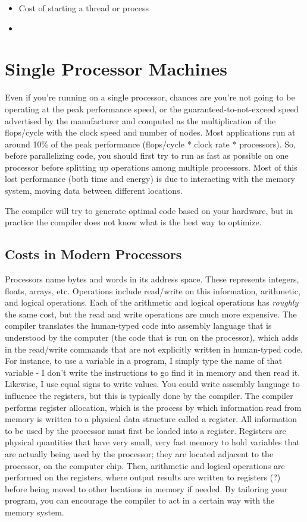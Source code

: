 \documentclass[10pt]{article}
\begin{document}
\begin{flushleft}
\begin{itemize}
\item Cost of starting a thread or process
\item 
\end{itemize}

\section{Single Processor Machines}
 
Even if you're running on a single processor, chances are you're not going to be operating at the peak performance speed, or the guaranteed-to-not-exceed speed advertised by the manufacturer and computed as the multiplication of the flops/cycle with the clock speed and number of nodes. Most applications run at around 10\% of the peak performance (flops/cycle * clock rate * processors). So, before parallelizing code, you should first try to run as fast as possible on one processor before splitting up operations among multiple processors. Most of this lost performance (both time and energy) is due to interacting with the memory system, moving data between different locations. 

The compiler will try to generate optimal code based on your hardware, but in practice the compiler does not know what is the best way to optimize. 

\subsection{Costs in Modern Processors}

Processors name bytes and words in its address space. These represents integers, floats, arrays, etc. Operations include read/write on this information, arithmetic, and logical operations. Each of the arithmetic and logical operations has \textit{roughly} the same cost, but the read and write operations are much more expensive. The compiler translates the human-typed code into assembly language that is understood by the computer (the code that is run on the processor), which adds in the read/write commands that are not explicitly written in human-typed code. For instance, to use a variable in a program, I simply type the name of that variable - I don't write the instructions to go find it in memory and then read it. Likewise, I use equal signs to write values. You could write assembly language to influence the registers, but this is typically done by the compiler. The compiler performs register allocation, which is the process by which information read from memory is written to a physical data structure called a register. All information to be used by the processor must first be loaded into a register. Registers are physical quantities that have very small, very fast memory to hold variables that are actually being used by the processor; they are located adjacent to the processor, on the computer chip. Then, arithmetic and logical operations are performed on the registers, where output results are written to registers (?) before being moved to other locations in memory if needed. By tailoring your program, you can encourage the compiler to act in a certain way with the memory system.


\end{flushleft}
\end{document}
